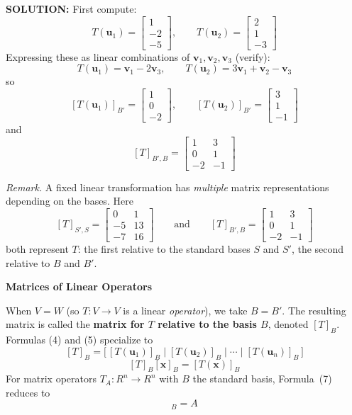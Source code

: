\documentclass{article}
\newcommand{\redheading}[1]{{\vspace{2mm}\noindent\Large\bfseries\color{red!55!black} #1\par}\vspace{2mm}}
\begin{document}
\textbf{SOLUTION:} First compute:
\[
  T(\mathbf{u}_1) = \begin{bmatrix}1\\-2\\-5\end{bmatrix}, \qquad
  T(\mathbf{u}_2) = \begin{bmatrix}2\\1\\-3\end{bmatrix}
\]
Expressing these as linear combinations of $\mathbf{v}_1, \mathbf{v}_2, \mathbf{v}_3$
(verify):
\[
  T(\mathbf{u}_1) = \mathbf{v}_1 - 2\mathbf{v}_3, \qquad
  T(\mathbf{u}_2) = 3\mathbf{v}_1 + \mathbf{v}_2 - \mathbf{v}_3
\]
so
\[
  [T(\mathbf{u}_1)]_{B'} = \begin{bmatrix}1\\0\\-2\end{bmatrix}, \qquad
  [T(\mathbf{u}_2)]_{B'} = \begin{bmatrix}3\\1\\-1\end{bmatrix}
\]
and
\[
  [T]_{B',B} = \begin{bmatrix}1&3\\0&1\\-2&-1\end{bmatrix}
\]

\textit{Remark.} A fixed linear transformation has \emph{multiple} matrix representations
depending on the bases. Here
\[
  [T]_{S',S} = \begin{bmatrix}0&1\\-5&13\\-7&16\end{bmatrix} \qquad\text{and}\qquad
  [T]_{B',B} = \begin{bmatrix}1&3\\0&1\\-2&-1\end{bmatrix}
\]
both represent $T$: the first relative to the standard bases $S$ and $S'$, the second
relative to $B$ and $B'$.

\vspace{2mm}
\redheading{Matrices of Linear Operators}

When $V = W$ (so $T : V \to V$ is a linear \emph{operator}), we take $B = B'$. The
resulting matrix is called the \textbf{matrix for $T$ relative to the basis $B$}, denoted
$[T]_B$. Formulas (4) and (5) specialize to
\begin{equation}
  \boxed{[T]_B = \bigl[\,[T(\mathbf{u}_1)]_B\;\big|\;[T(\mathbf{u}_2)]_B\;\big|\;
  \cdots\;\big|\;[T(\mathbf{u}_n)]_B\,\bigr]} \tag{7}
\end{equation}
\begin{equation}
  \boxed{[T]_B[\mathbf{x}]_B = [T(\mathbf{x})]_B} \tag{8}
\end{equation}
For matrix operators $T_A : R^n \to R^n$ with $B$ the standard basis, Formula~(7)
reduces to
\begin{equation}
  [T_A]_B = A \tag{9}
\end{equation}
\end{document}
